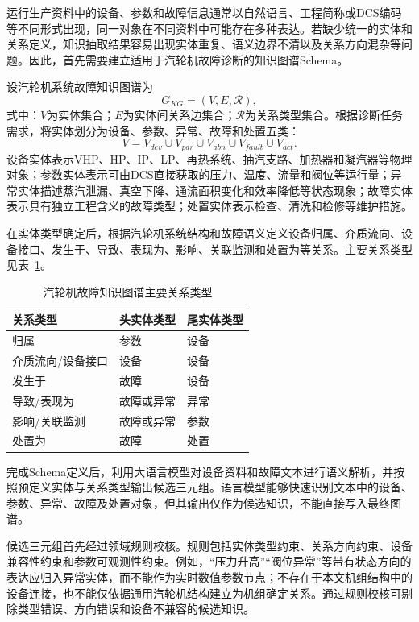运行生产资料中的设备、参数和故障信息通常以自然语言、工程简称或DCS编码等不同形式出现，同一对象在不同资料中可能存在多种表达。若缺少统一的实体和关系定义，知识抽取结果容易出现实体重复、语义边界不清以及关系方向混杂等问题。因此，首先需要建立适用于汽轮机故障诊断的知识图谱Schema。

设汽轮机系统故障知识图谱为
\begin{equation}
G_{KG}=(V,E,\mathcal R),
\end{equation}
式中：$V$为实体集合；$E$为实体间关系边集合；$\mathcal R$为关系类型集合。根据诊断任务需求，将实体划分为设备、参数、异常、故障和处置五类：
\begin{equation}
V=V_{dev}\cup V_{par}\cup V_{abn}\cup V_{fault}\cup V_{act}.
\end{equation}
设备实体表示VHP、HP、IP、LP、再热系统、抽汽支路、加热器和凝汽器等物理对象；参数实体表示可由DCS直接获取的压力、温度、流量和阀位等运行量；异常实体描述蒸汽泄漏、真空下降、通流面积变化和效率降低等状态现象；故障实体表示具有独立工程含义的故障类型；处置实体表示检查、清洗和检修等维护措施。

在实体类型确定后，根据汽轮机系统结构和故障语义定义设备归属、介质流向、设备接口、发生于、导致、表现为、影响、关联监测和处置为等关系。主要关系类型见表~\ref{tab:kg_relation_types_v8}。

\begin{table}[htbp]
    \centering
    \caption{汽轮机故障知识图谱主要关系类型}
    \label{tab:kg_relation_types_v8}
    \begin{tabular}{lll}
        \toprule
        关系类型 & 头实体类型 & 尾实体类型 \\
        \midrule
        归属 & 参数 & 设备 \\
        介质流向/设备接口 & 设备 & 设备 \\
        发生于 & 故障 & 设备 \\
        导致/表现为 & 故障或异常 & 异常 \\
        影响/关联监测 & 故障或异常 & 参数 \\
        处置为 & 故障 & 处置 \\
        \bottomrule
    \end{tabular}
\end{table}

完成Schema定义后，利用大语言模型对设备资料和故障文本进行语义解析，并按照预定义实体与关系类型输出候选三元组。语言模型能够快速识别文本中的设备、参数、异常、故障及处置对象，但其输出仅作为候选知识，不能直接写入最终图谱。

候选三元组首先经过领域规则校核。规则包括实体类型约束、关系方向约束、设备兼容性约束和参数可观测性约束。例如，“压力升高”“阀位异常”等带有状态方向的表达应归入异常实体，而不能作为实时数值参数节点；不存在于本文机组结构中的设备连接，也不能仅依据通用汽轮机结构建立为机组确定关系。通过规则校核可剔除类型错误、方向错误和设备不兼容的候选知识。

